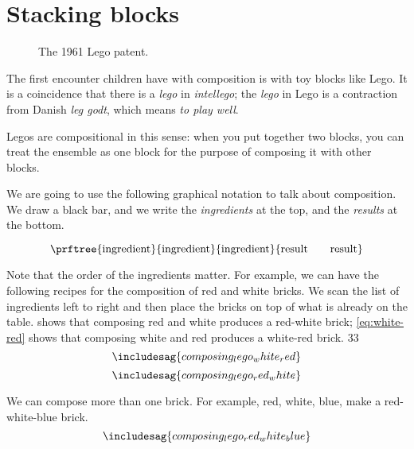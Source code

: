 

\section{Stacking blocks}
\begin{figure*}[p]
  \centering
%
  \caption{The 1961 Lego patent.}
\end{figure*}


The first encounter children have with composition is with toy blocks like Lego. It is a coincidence that there is a \emph{lego} in \emph{intellego}; the \emph{lego} in Lego is a contraction from Danish \emph{leg godt}, which means \emph{to play well}.

Legos are compositional in this sense: when you put together two blocks, you can treat the ensemble as one block for the purpose of composing it with other blocks.

We are going to use the following graphical notation to talk about composition.
We draw a black bar, and we write the \emph{ingredients} at the top, and the \emph{results} at the bottom.

\begin{equation}
\prftree{
    \text{ingredient}
}{
    \text{ingredient}
}{
    \text{ingredient}
}{
    \text{result} \quad \quad \text{result}
}
\end{equation}

Note that the order of the ingredients matter.
For example, we can have the following recipes for the composition of red and white bricks.
We scan the list of ingredients left to right and then place the bricks on top of what is already on the table.
 shows that composing red and white produces a red-white brick;
\cref{eq:white-red} shows that composing white and red produces a white-red brick.
33\begin{equation}\label{eq:red-white}
\includesag{composing_lego_white_red}
\end{equation}
%
\begin{equation}\label{eq:white-red}
\includesag{composing_lego_red_white}
\end{equation}

We can compose more than one brick.
For example, red, white, blue, make a red-white-blue brick.
\begin{equation}
\includesag{composing_lego_red_white_blue}
\end{equation}

